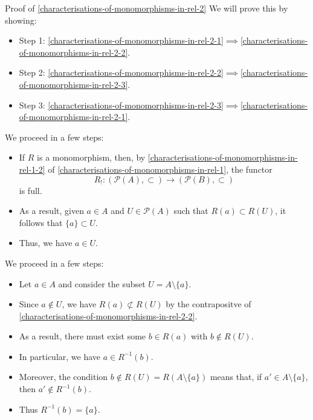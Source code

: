 \begin{Proof}{Proof of \cref{characterisations-of-monomorphisms-in-rel-2}}%
    We will prove this by showing:
    \begin{itemize}
        \item Step 1: \cref{characterisations-of-monomorphisms-in-rel-2-1}$\implies$\cref{characterisations-of-monomorphisms-in-rel-2-2}.
        \item Step 2: \cref{characterisations-of-monomorphisms-in-rel-2-2}$\implies$\cref{characterisations-of-monomorphisms-in-rel-2-3}.
        \item Step 3: \cref{characterisations-of-monomorphisms-in-rel-2-3}$\implies$\cref{characterisations-of-monomorphisms-in-rel-2-1}.
    \end{itemize}

    We proceed in a few steps:
    \begin{itemize}
        \item If $R$ is a monomorphism, then, by \cref{characterisations-of-monomorphisms-in-rel-1-2} of \cref{characterisations-of-monomorphisms-in-rel-1}, the functor
            \[
                R_{!}%
                \colon%
                (\mathcal{P}(A),\subset)%
                \to%
                (\mathcal{P}(B),\subset)%
            \]%
            is full.
        \item As a result, given $a\in A$ and $U\in\mathcal{P}(A)$ such that $R(a)\subset R(U)$, it follows that $\{a\}\subset U$.
        \item Thus, we have $a\in U$.
    \end{itemize}

    We proceed in a few steps:
    \begin{itemize}
        \item Let $a\in A$ and consider the subset $U=A\setminus\{a\}$.
        \item Since $a\nin U$, we have $R(a)\nsubset R(U)$ by the contrapositve of \cref{characterisations-of-monomorphisms-in-rel-2-2}.
        \item As a result, there must exist some $b\in R(a)$ with $b\nin R(U)$.
        \item In particular, we have $a\in R^{-1}(b)$.
        \item Moreover, the condition $b\nin R(U)=R(A\setminus\{a\})$ means that, if $a'\in A\setminus\{a\}$, then $a'\nin R^{-1}(b)$.
        \item Thus $R^{-1}(b)=\{a\}$.
    \end{itemize}


\end{Proof}
